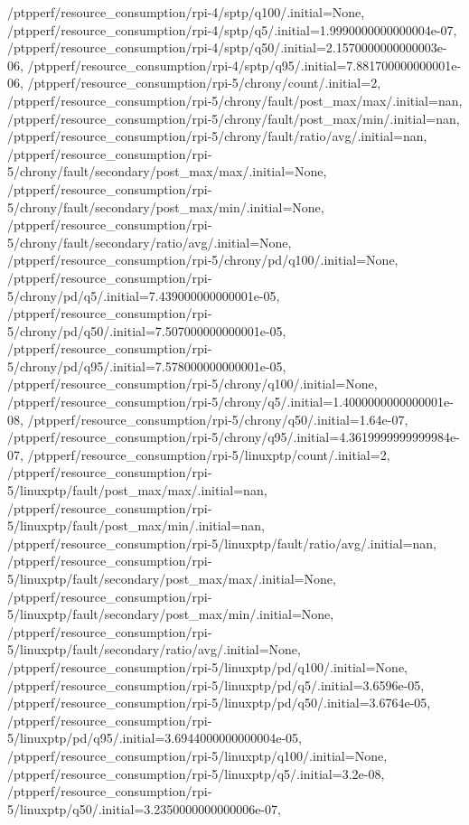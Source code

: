 {    /ptpperf/resource_consumption/rpi-4/sptp/q100/.initial=None,
    /ptpperf/resource_consumption/rpi-4/sptp/q5/.initial=1.9990000000000004e-07,
    /ptpperf/resource_consumption/rpi-4/sptp/q50/.initial=2.1570000000000003e-06,
    /ptpperf/resource_consumption/rpi-4/sptp/q95/.initial=7.881700000000001e-06,
    /ptpperf/resource_consumption/rpi-5/chrony/count/.initial=2,
    /ptpperf/resource_consumption/rpi-5/chrony/fault/post_max/max/.initial=nan,
    /ptpperf/resource_consumption/rpi-5/chrony/fault/post_max/min/.initial=nan,
    /ptpperf/resource_consumption/rpi-5/chrony/fault/ratio/avg/.initial=nan,
    /ptpperf/resource_consumption/rpi-5/chrony/fault/secondary/post_max/max/.initial=None,
    /ptpperf/resource_consumption/rpi-5/chrony/fault/secondary/post_max/min/.initial=None,
    /ptpperf/resource_consumption/rpi-5/chrony/fault/secondary/ratio/avg/.initial=None,
    /ptpperf/resource_consumption/rpi-5/chrony/pd/q100/.initial=None,
    /ptpperf/resource_consumption/rpi-5/chrony/pd/q5/.initial=7.439000000000001e-05,
    /ptpperf/resource_consumption/rpi-5/chrony/pd/q50/.initial=7.507000000000001e-05,
    /ptpperf/resource_consumption/rpi-5/chrony/pd/q95/.initial=7.578000000000001e-05,
    /ptpperf/resource_consumption/rpi-5/chrony/q100/.initial=None,
    /ptpperf/resource_consumption/rpi-5/chrony/q5/.initial=1.4000000000000001e-08,
    /ptpperf/resource_consumption/rpi-5/chrony/q50/.initial=1.64e-07,
    /ptpperf/resource_consumption/rpi-5/chrony/q95/.initial=4.3619999999999984e-07,
    /ptpperf/resource_consumption/rpi-5/linuxptp/count/.initial=2,
    /ptpperf/resource_consumption/rpi-5/linuxptp/fault/post_max/max/.initial=nan,
    /ptpperf/resource_consumption/rpi-5/linuxptp/fault/post_max/min/.initial=nan,
    /ptpperf/resource_consumption/rpi-5/linuxptp/fault/ratio/avg/.initial=nan,
    /ptpperf/resource_consumption/rpi-5/linuxptp/fault/secondary/post_max/max/.initial=None,
    /ptpperf/resource_consumption/rpi-5/linuxptp/fault/secondary/post_max/min/.initial=None,
    /ptpperf/resource_consumption/rpi-5/linuxptp/fault/secondary/ratio/avg/.initial=None,
    /ptpperf/resource_consumption/rpi-5/linuxptp/pd/q100/.initial=None,
    /ptpperf/resource_consumption/rpi-5/linuxptp/pd/q5/.initial=3.6596e-05,
    /ptpperf/resource_consumption/rpi-5/linuxptp/pd/q50/.initial=3.6764e-05,
    /ptpperf/resource_consumption/rpi-5/linuxptp/pd/q95/.initial=3.6944000000000004e-05,
    /ptpperf/resource_consumption/rpi-5/linuxptp/q100/.initial=None,
    /ptpperf/resource_consumption/rpi-5/linuxptp/q5/.initial=3.2e-08,
    /ptpperf/resource_consumption/rpi-5/linuxptp/q50/.initial=3.2350000000000006e-07,
}
